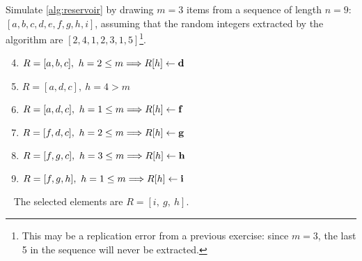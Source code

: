 \exercise

Simulate \autoref{alg:reservoir} by drawing $m = 3$ items from a sequence
of length $n = 9$: $[a, b, c, d, e, f, g, h, i]$, assuming that the random
integers extracted by the algorithm are $[2, 4, 1, 2, 3, 1, 5]$\footnote{This
may be a replication error from a previous exercise: since $m = 3$, the last 5
in the sequence will never be extracted.}.

\solution

\begin{enumerate}[\bf a.]
  \setcounter{enumi}{3}
  \item $R = [a, b, c],\ h = 2 \le m \Longrightarrow R[h] \gets \text{\bf d}$
  \item $R = [a, d, c],\ h = 4 > m$
  \item $R = [a, d, c],\ h = 1 \le m \Longrightarrow R[h] \gets \text{\bf f}$
  \item $R = [f, d, c],\ h = 2 \le m \Longrightarrow R[h] \gets \text{\bf g}$
  \item $R = [f, g, c],\ h = 3 \le m \Longrightarrow R[h] \gets \text{\bf h}$
  \item $R = [f, g, h],\ h = 1 \le m \Longrightarrow R[h] \gets \text{\bf i}$
\end{enumerate}\
%
The selected elements are $R = [ i,\ g,\ h ]$.
